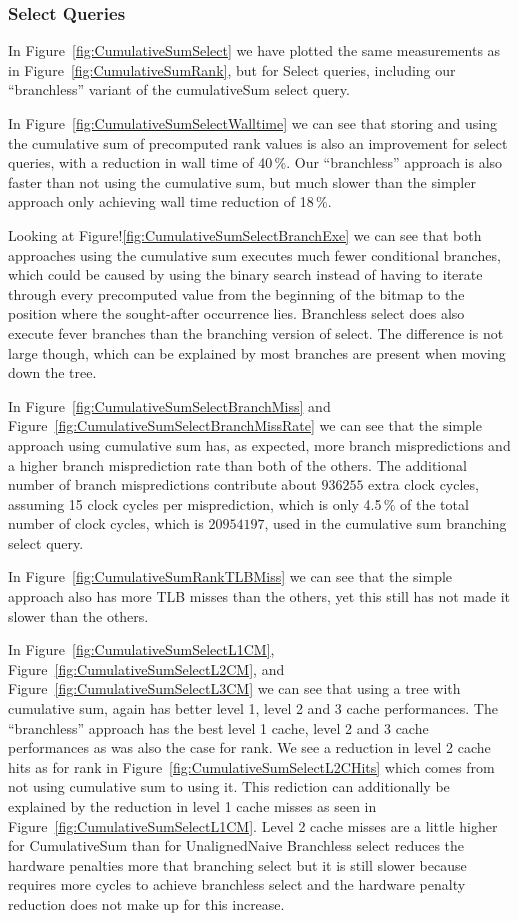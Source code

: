 \subsubsection{Select Queries}
\label{sec:cumulativeSumExperimentSelectQueries}
In Figure~\ref{fig:CumulativeSumSelect} we have plotted the same measurements as in Figure~\ref{fig:CumulativeSumRank}, but for Select queries, including our “branchless” variant of the cumulativeSum select query.

In Figure~\ref{fig:CumulativeSumSelectWalltime} we can see that storing and using the cumulative sum of precomputed rank values is also an improvement for select queries, with a reduction in wall time of 40\,\%.
Our “branchless” approach is also faster than not using the cumulative sum, but much slower than the simpler approach only achieving wall time reduction of 18\,\%.

Looking at Figure!\ref{fig:CumulativeSumSelectBranchExe} we can see that both approaches using the cumulative sum executes much fewer conditional branches, which could be caused by using the binary search instead of having to iterate through every precomputed value from the beginning of the bitmap to the position where the sought-after occurrence lies.
Branchless select does also execute fever branches than the branching version of select.
The difference is not large though, which can be explained by most branches are present when moving down the tree.


In Figure~\ref{fig:CumulativeSumSelectBranchMiss} and Figure~\ref{fig:CumulativeSumSelectBranchMissRate} we can see that the simple approach using cumulative sum has, as expected, more branch mispredictions and a higher branch misprediction rate than both of the others.
The additional number of branch mispredictions contribute about $\num{936255}$ extra clock cycles, assuming 15 clock cycles per misprediction, which is only 4.5\,\% of the total number of clock cycles, which is $\num{20954197}$, used in the cumulative sum branching select query.

In Figure~\ref{fig:CumulativeSumRankTLBMiss} we can see that the simple approach also has more TLB misses than the others, yet this still has not made it slower than the others.

In Figure~\ref{fig:CumulativeSumSelectL1CM}, Figure~\ref{fig:CumulativeSumSelectL2CM}, and Figure~\ref{fig:CumulativeSumSelectL3CM} we can see that using a tree with cumulative sum, again has better level 1, level 2 and 3 cache performances.
The “branchless” approach has the best level 1 cache, level 2 and 3 cache performances as was also the case for rank.
We see a reduction in level 2 cache hits as for rank in Figure~\ref{fig:CumulativeSumSelectL2CHits} which comes from not using cumulative sum to using it. 
This rediction can additionally be explained by the reduction in level 1 cache misses as seen in Figure~\ref{fig:CumulativeSumSelectL1CM}.
Level 2 cache misses are a little higher for CumulativeSum than for UnalignedNaive
Branchless select reduces the hardware penalties more that branching select but it is still slower because requires more cycles to achieve branchless select and the hardware penalty reduction does not make up for this increase.


